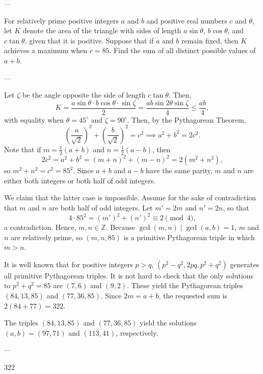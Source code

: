 
---

For relatively prime positive integers $a$ and $b$ and positive real numbers $c$ and $\theta$, let $K$ denote the area of the triangle with sides of length $a\sin\theta$, $b\cos\theta$, and $c\tan\theta$, given that it is positive. Suppose that if $a$ and $b$ remain fixed, then $K$ achieves a maximum when $c=85$. Find the sum of all distinct possible values of $a+b$.

---

Let $\zeta$ be the angle opposite the side of length $c\tan\theta$. Then, \[K=\frac{a\sin\theta\cdot b\cos\theta\cdot\sin\zeta}2=\frac{ab\sin 2\theta\sin\zeta}4\le\frac{ab}4,\]
with equality when $\theta=45^\circ$ and $\zeta=90^\circ$.  Then, by the Pythagorean Theorem, \[\left(\frac a{\sqrt2}\right)^2+\left(\frac b{\sqrt 2}\right)^2=c^2\implies a^2+b^2=2c^2.\]
Note that if $m=\tfrac12(a+b)$ and $n=\tfrac12(a-b)$, then \[2c^2=a^2+b^2=(m+n)^2+(m-n)^2=2(m^2+n^2),\]
so $m^2+n^2=c^2=85^2$. Since $a+b$ and $a-b$ have the same parity, $m$ and $n$ are either both integers or both half of odd integers.

We claim that the latter case is impossible. Assume for the sake of contradiction that $m$ and $n$ are both half of odd integers. Let $m'=2m$ and $n'=2n$, so that \[4\cdot 85^2=(m')^2+(n')^2\equiv 2\pmod4,\]
a contradiction. Hence, $m,n\in\mathbb Z$. Because $\gcd(m,n)\mid\gcd(a,b)=1$, $m$ and $n$ are relatively prime, so $(m,n,85)$ is a primitive Pythagorean triple in which $m>n$.

It is well known that for positive integers $p>q$, $(p^2-q^2,2pq,p^2+q^2)$ generates all primitive Pythagorean triples. It is not hard to check that the only solutions to $p^2+q^2=85$ are $(7,6)$ and $(9,2)$. These yield the Pythagorean triples $(84,13,85)$ and $(77,36,85)$. Since $2m=a+b$, the requested sum is $2(84+77)=322$.
\begin{boxremark}
    The triples $(84,13,85)$ and $(77,36,85)$ yield the solutions $(a,b)=(97,71)$ and $(113,41)$, respectively.
\end{boxremark}

---

322
